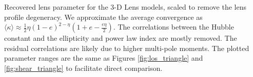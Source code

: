 \label{fig:scaled_triangle} Recovered lens parameter for the 3-D Lens models, scaled to remove the lens profile degeneracy. We approximate the average convergence as $\langle \kappa \rangle \approx \frac{1}{2} \eta  (1 - e)^{2 - \eta} \left(1 +  e - \frac{e \eta }{2}\right).$ The correlations between the Hubble constant and the ellipticity and power law index are mostly removed. The residual correlations are likely due to higher multi-pole moments. The plotted parameter ranges are the same as Figures \ref{fig:los_triangle} and \ref{fig:shear_triangle} to facilitate direct comparison.